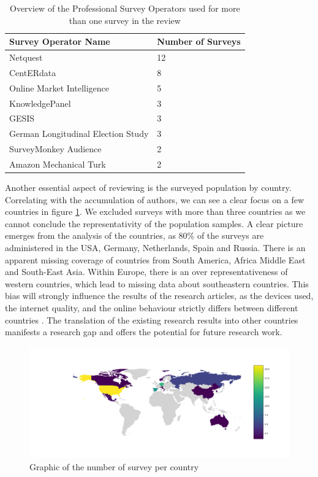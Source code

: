 \begin{table}
	\centering
	\begin{tabular}{ll}
		\toprule
		Survey Operator Name & Number of Surveys \\
		\midrule
        Netquest & 12\\
        CentERdata &8\\
        Online Market Intelligence &5\\
        KnowledgePanel  &3\\
        GESIS &3\\
        German Longitudinal Election Study &3\\
        SurveyMonkey Audience  &2\\
        Amazon Mechanical Turk & 2\\
		\bottomrule 
	\end{tabular}
	\caption{Overview of the Professional Survey Operators used for more than one survey in the review}
	\label{tab: operator}
\end{table}


Another essential aspect of reviewing is the surveyed population by country. Correlating with the accumulation of authors, we can see a clear focus on a few countries in figure \ref{fig: surveys_per_country}. We excluded surveys with more than three countries as we cannot conclude the representativity of the population samples. A clear picture emerges from the analysis of the countries, as 80\% of the surveys are administered in the USA, Germany, Netherlands, Spain and Russia. There is an apparent missing coverage of countries from South America, Africa Middle East and South-East Asia. Within Europe, there is an over representativeness of western countries, which lead to missing data about southeastern countries. This bias will strongly influence the results of the research articles, as the devices used, the internet quality, and the online behaviour strictly differs between different countries \cite{rodriguez-castelan_mobile_2021, kuss_internet_2021}. The translation of the existing research results into other countries manifests a research gap and offers the potential for future research work.

\begin{figure}
    \centering
    \includegraphics[width=\textwidth]{reports/figures/surveys_per_country.png}
     \caption{Graphic of the number of survey per country}
    \label{fig: surveys_per_country}
\end{figure}

